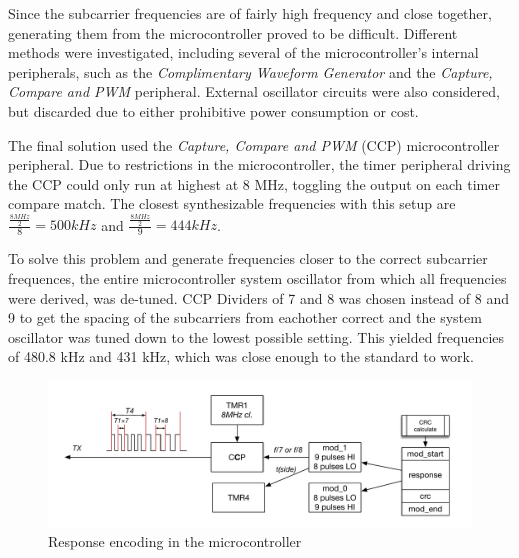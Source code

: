 Since the subcarrier frequencies are of fairly high frequency and close together, generating them from the microcontroller proved to be difficult.
Different methods were investigated, including several of the microcontroller's internal peripherals, such as the \emph{Complimentary Waveform Generator} and the \emph{Capture, Compare and PWM} peripheral. External oscillator circuits were also considered, but discarded due to either prohibitive power consumption or cost.

The final solution used the \emph{Capture, Compare and PWM} (CCP) microcontroller peripheral.
Due to restrictions in the microcontroller, the timer peripheral driving the CCP could only run at highest at 8 MHz, toggling the output on each timer compare match.
The closest synthesizable frequencies with this setup are $\frac{\frac{8 MHz}{2}}{8} = 500 kHz$ and $\frac{\frac{8 MHz}{2}}{9} = 444 kHz$.

To solve this problem and generate frequencies closer to the correct subcarrier frequences, the entire microcontroller system oscillator from which all frequencies were derived, was de-tuned.
CCP Dividers of 7 and 8 was chosen instead of 8 and 9 to get the spacing of the subcarriers from eachother correct and the system oscillator was tuned down to the lowest possible setting.
This yielded frequencies of 480.8 kHz and 431 kHz, which was close enough to the standard to work.

\begin{figure}[h!]
    \centering
    \includegraphics[scale=0.5]{res/TX.pdf}
    \caption{Response encoding in the microcontroller}
    \label{fig:tx}
\end{figure}


